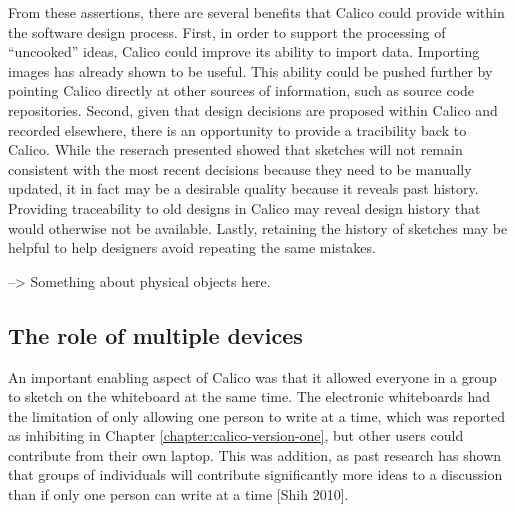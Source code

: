 

%

From these assertions, there are several benefits that Calico could provide within the software design process. First, in order to support the processing of ``uncooked'' ideas, Calico could improve its ability to import data. Importing images has already shown to be useful. This ability could be pushed further by pointing Calico directly at other sources of information, such as source code repositories. Second, given that design decisions are proposed within Calico and recorded elsewhere, there is an opportunity to provide a tracibility back to Calico. While the reserach presented showed that sketches will not remain consistent with the most recent decisions because they need to be manually updated, it in fact may be a desirable quality because it reveals past history. Providing traceability to old designs in Calico may reveal design history that would otherwise not be available. Lastly, retaining the history of sketches may be helpful to help designers avoid repeating the same mistakes.

--> Something about physical objects here.

\subsection{The role of multiple devices}

An important enabling aspect of Calico was that it allowed everyone in a group to sketch on the whiteboard at the same time. The electronic whiteboards had the limitation of only allowing one person to write at a time, which was reported as inhibiting in Chapter \ref{chapter:calico-version-one}, but other users could contribute from their own laptop. This was addition, as past research has shown that groups of individuals will contribute significantly more ideas to a discussion than if only one person can write at a time [Shih 2010].

